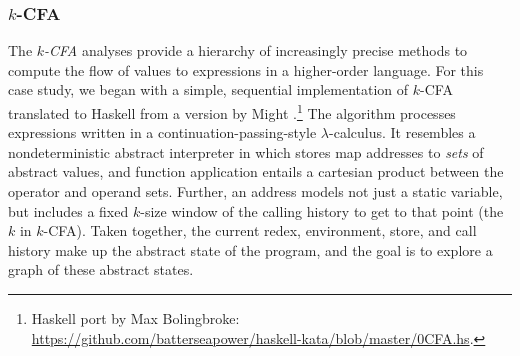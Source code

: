 



\subsubsection{$k$-CFA}

The {\em $k$-CFA} analyses provide a hierarchy of increasingly precise methods
to compute the flow of values to expressions in a higher-order language.  
For this case study, we began with a simple, sequential implementation of $k$-CFA 
translated to Haskell from a version by Might \cite{MightkCFABlog}.\footnote{Haskell
 port by Max Bolingbroke: \url{https://github.com/batterseapower/haskell-kata/blob/master/0CFA.hs}.}
The algorithm processes expressions written in a
continuation-passing-style $\lambda$-calculus.
It resembles a nondeterministic abstract interpreter in which
stores map addresses to {\em sets} of abstract values, and function
application entails a cartesian product between the operator and operand sets.
%
Further, an address models not just a static variable, but includes a fixed $k$-size window
of the calling history to get to that point (the $k$ in $k$-CFA).
%
Taken together, the current 
redex, environment, store, and call history make up the abstract state of the
program, and the goal is to explore a graph of these abstract states.  
%
%

